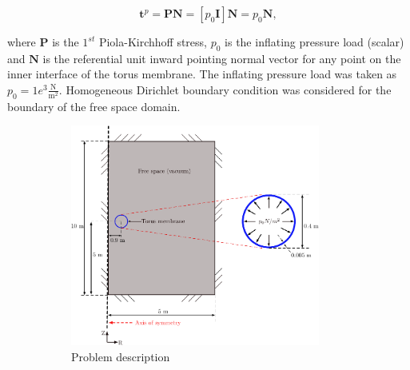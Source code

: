 \documentclass[11pt,a4paper,final]{article}
\begin{document}
\begin{equation}
\mathbf{t}^p = \mathbf{P}\mathbf{N} = \left[ p_0 \mathbf{I} \right] \mathbf{N} = p_0 \mathbf{N},
\end{equation}

\noindent where $\mathbf{P}$ is the $1^{st}$ Piola-Kirchhoff stress, $p_0$ is the inflating pressure load (scalar) and $\mathbf{N}$ is the referential unit inward pointing normal vector for any point on the inner interface of the torus membrane. The inflating pressure load was taken as $p_0 = 1e^{3} \frac{\text{N}}{\text{m}^2}$. Homogeneous Dirichlet boundary condition was considered for the boundary of the free space domain.\par 

\begin{figure}[h]
\centering 
\begin{subfigure}[b]{0.6\textwidth}
\centering
\includegraphics[width=0.9\textwidth]{torus_membrane_grid.pdf}
\caption{\scriptsize{Problem description}}
\label{fig:1.7.1}
\end{subfigure}
\begin{subfigure}[b]{0.39\textwidth}
\centering

\end{subfigure}
\end{figure}
\end{document}
